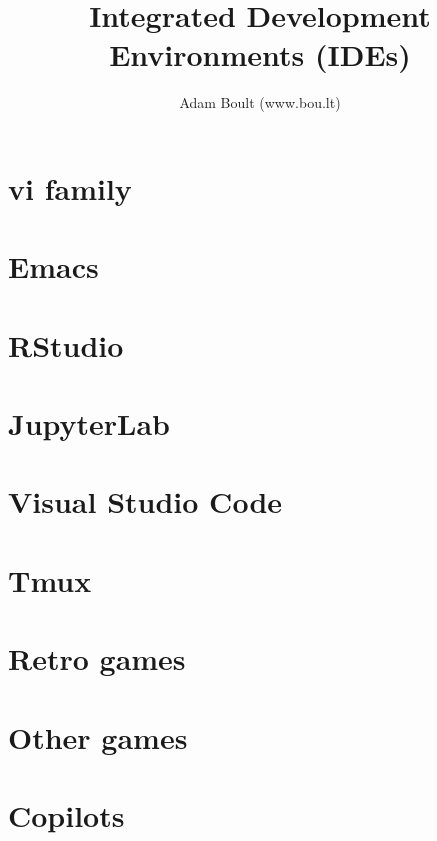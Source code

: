 \documentclass[oneside]{book}
\begin{document}
\author{Adam Boult (www.bou.lt)}
\title{Integrated Development Environments (IDEs)}
\maketitle

\setcounter{tocdepth}{0}
\tableofcontents



\part{vi family}



\part{Emacs}


\part{RStudio}


\part{JupyterLab}


\part{Visual Studio Code}


\part{Tmux}


\part{Retro games}



\part{Other games}






\part{Copilots}

\end{document}
